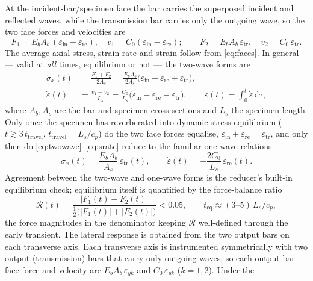 \documentclass[11pt]{article}
\newcommand{\Cz}{C_{0}}
\newcommand{\eps}{\varepsilon}
\newcommand{\epsd}{\dot{\varepsilon}}
\begin{document}
At the incident-bar/specimen face the bar carries the superposed incident and
reflected waves, while the transmission bar carries only the outgoing wave, so the
two face forces and velocities are
\begin{equation}
F_1=E_bA_b\,(\eps_{\mathrm{in}}+\eps_{\mathrm{re}}),\quad
v_1=\Cz(\eps_{\mathrm{in}}-\eps_{\mathrm{re}});\qquad
F_2=E_bA_b\,\eps_{\mathrm{tr}},\quad
v_2=\Cz\,\eps_{\mathrm{tr}}.
\label{eq:faces}
\end{equation}
The average axial stress, strain rate and strain follow from \eqref{eq:faces}. In
general --- valid at \emph{all} times, equilibrium or not --- the two-wave forms are
\begin{align}
\sigma_x(t) &= \frac{F_1+F_2}{2A_s}=\frac{E_b A_b}{2 A_s}\big(\eps_{\mathrm{in}}+\eps_{\mathrm{re}}+\eps_{\mathrm{tr}}\big), \label{eq:twowave}\\
\epsd(t)    &= \frac{v_1-v_2}{L_s}=\frac{\Cz}{L_s}\big(\eps_{\mathrm{in}}-\eps_{\mathrm{re}}-\eps_{\mathrm{tr}}\big), \qquad
\eps(t)=\int_0^t \epsd\,\mathrm{d}\tau, \label{eq:srate}
\end{align}
where $A_b,A_s$ are the bar and specimen cross-sections and $L_s$ the specimen
length. Only once the specimen has reverberated into dynamic stress equilibrium
($t\gtrsim 3\,t_{\mathrm{travel}}$, $t_{\mathrm{travel}}=L_s/c_p$) do the two face
forces equalise, $\eps_{\mathrm{in}}+\eps_{\mathrm{re}}=\eps_{\mathrm{tr}}$, and
only then do \eqref{eq:twowave}--\eqref{eq:srate} reduce to the familiar one-wave
relations
\begin{equation}
\sigma_x(t)=\frac{E_b A_b}{A_s}\,\eps_{\mathrm{tr}}(t),\qquad
\epsd(t)=-\frac{2\Cz}{L_s}\,\eps_{\mathrm{re}}(t).
\label{eq:onewave}
\end{equation}
Agreement between the two-wave and one-wave forms is the reducer's built-in
equilibrium check; equilibrium itself is quantified by the force-balance ratio
\begin{equation}
\mathcal{R}(t)=\frac{|F_1(t)-F_2(t)|}{\tfrac12\big(|F_1(t)|+|F_2(t)|\big)}<0.05,
\qquad t_{\mathrm{eq}}\approx(3\text{--}5)\,L_s/c_p,
\label{eq:equil}
\end{equation}
the force magnitudes in the denominator keeping $\mathcal{R}$ well-defined through
the early transient.
The lateral response is obtained from the two output bars on each transverse
axis. Each transverse axis is instrumented symmetrically with two output
(transmission) bars that carry only outgoing waves, so each output-bar face force
and velocity are $E_bA_b\,\eps_{yk}$ and $\Cz\,\eps_{yk}$ ($k=1,2$). Under the
\end{document}
